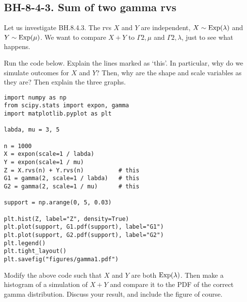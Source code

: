 \subsection{BH-8-4-3. Sum of two gamma rvs}
\label{sec:sum-two-gamma}

Let us investigate BH.8.4.3. The rvs $X$ and $Y$ are independent, $X\sim\mathrm{Exp}(\lambda)$ and $Y\sim\mathrm{Exp}(\mu)$. We want to compare $X+Y$ to $\Gamma{2, \mu}$ and $\Gamma{2, \lambda}$, just to see what happens.

\begin{exercise}
Run the  code below. Explain the lines marked as `this'. In particular, why do we simulate outcomes for $X$ and $Y$? Then, why are the shape and scale variables as they are? Then explain the three graphs.
\begin{verbatim}
import numpy as np
from scipy.stats import expon, gamma
import matplotlib.pyplot as plt

labda, mu = 3, 5

n = 1000
X = expon(scale=1 / labda)
Y = expon(scale=1 / mu)
Z = X.rvs(n) + Y.rvs(n)          # this
G1 = gamma(2, scale=1 / labda)   # this
G2 = gamma(2, scale=1 / mu)      # this

support = np.arange(0, 5, 0.03)

plt.hist(Z, label="Z", density=True)
plt.plot(support, G1.pdf(support), label="G1")
plt.plot(support, G2.pdf(support), label="G2")
plt.legend()
plt.tight_layout()
plt.savefig("figures/gamma1.pdf")
\end{verbatim}
\end{exercise}

\begin{exercise}
Modify the above code such that $X$ and $Y$ are both $\mathrm{Exp}(\lambda)$. Then make a histogram of a simulation of $X+Y$ and compare it to the PDF of the correct gamma  distribution. Discuss your result, and include the figure of course.
\end{exercise}
